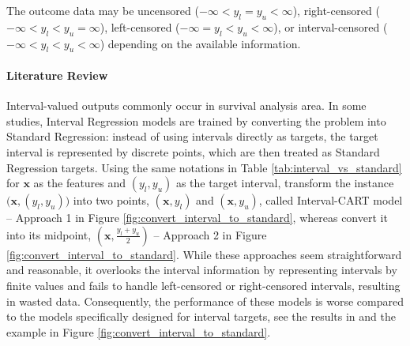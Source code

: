 \documentclass[12pt]{article}
\begin{document}
The outcome data may be uncensored ($-\infty < y_l = y_u < \infty$), right-censored ($-\infty < y_l < y_u = \infty$), left-censored ($-\infty = y_l < y_u < \infty$), or interval-censored ($-\infty < y_l < y_u < \infty$) depending on the available information.

\paragraph{Literature Review} Interval-valued outputs commonly occur in survival analysis area.
In some studies, Interval Regression models are trained by converting the problem into Standard Regression: instead of using intervals directly as targets, the target interval is represented by discrete points, which are then treated as Standard Regression targets.
Using the same notations in Table \ref{tab:interval_vs_standard} for $\mathbf{x}$ as the features and $(y_l, y_u)$ as the target interval,
\citet{mmit} transform the instance $\big(\mathbf{x}, (y_l, y_u)\big)$ into two points, \((\mathbf{x}, y_l)\) and \((\mathbf{x}, y_u)\), called Interval-CART model -- Approach 1 in Figure \ref{fig:convert_interval_to_standard}, whereas \citet{rit} convert it into its midpoint, \((\mathbf{x}, \frac{y_l + y_u}{2})\) -- Approach 2 in Figure \ref{fig:convert_interval_to_standard}.
While these approaches seem straightforward and reasonable, it overlooks the interval information by representing intervals by finite values and fails to handle left-censored or right-censored intervals, resulting in wasted data.
Consequently, the performance of these models is worse compared to the models specifically designed for interval targets, see the results in \citep{mmit, rit} and the example in Figure \ref{fig:convert_interval_to_standard}.
\end{document}
